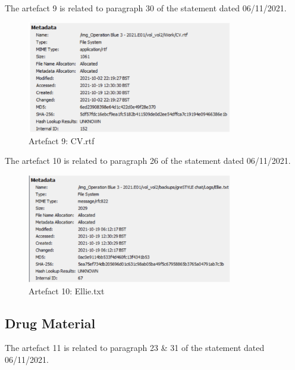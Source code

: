 \newpage
The artefact 9 is related to paragraph 30 of the statement dated 06/11/2021.
\begin{figure}[H]
  \centering
  \includegraphics[width=0.8\textwidth]{figures/meta9}
  \caption{Artefact 9: CV.rtf}
  \label{f:meta9}
\end{figure}
The artefact 10 is related to paragraph 26 of the statement dated 06/11/2021.
\begin{figure}[H]
  \centering
  \includegraphics[width=0.8\textwidth]{figures/meta10}
  \caption{Artefact 10: Ellie.txt}
  \label{f:meta10}
\end{figure}

\newpage
\subsection{Drug Material}
The artefact 11 is related to paragraph 23 \& 31 of the statement dated
06/11/2021.

